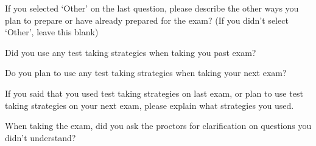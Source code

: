 \documentclass{ximera}
\begin{document}
\begin{question}
    If you selected `Other' on the last question, please describe the other ways you plan to prepare or have already prepared for the exam? (If you didn't select `Other', leave this blank)\\

    \begin{freeResponse}
    \end{freeResponse}
\end{question}




\begin{question}
    Did you use any test taking strategies when taking you past exam?

  \begin{multipleChoice}
  \end{multipleChoice}
\end{question}

\begin{question}
    Do you plan to use any test taking strategies when taking your next exam?

  \begin{multipleChoice}
  \end{multipleChoice}
\end{question}

\begin{question}
    If you said that you used test taking strategies on last exam, or plan to use test taking strategies on your next exam, please explain what strategies you used.

    \begin{freeResponse}
    \end{freeResponse}
\end{question}

\begin{question}
   When taking the exam, did you ask the proctors for clarification on questions you didn't understand?

  \begin{multipleChoice}
  \end{multipleChoice}
\end{question}
\end{document}
